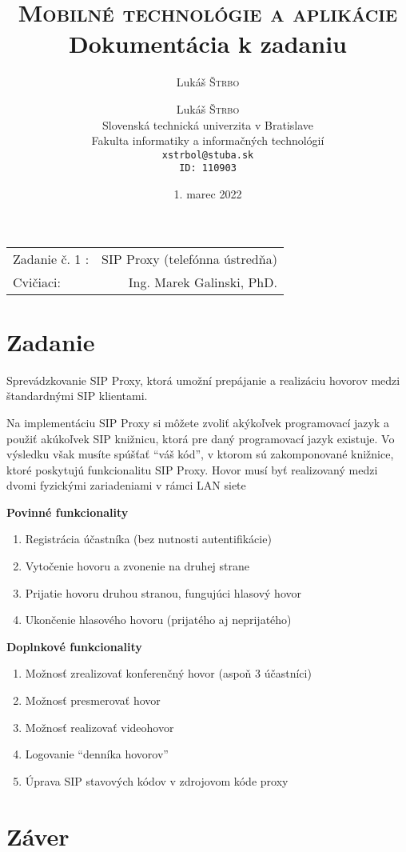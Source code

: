 \documentclass[10pt,oneside,slovak,a4paper]{article}
\title{\textsc{Mobilné technológie a aplikácie}\\ Dokumentácia k zadaniu} %
\author{Lukáš \textsc{Štrbo}} %
\date{1. marec 2022}
\author{Lukáš \textsc{Štrbo}\\[2pt]
	{\small Slovenská technická univerzita v Bratislave}\\
	{\small Fakulta informatiky a informačných technológií}\\
	{\small \texttt{xstrbol@stuba.sk}}\\
{\small \texttt{ID: 110903}}\\
	}
\begin{document}
\maketitle %

\begin{center}
\begin{tabular}{l r}
Zadanie č. 1 : & SIP Proxy (telefónna ústredňa)\\ 
Cvičiaci: & Ing. Marek Galinski, PhD.
\end{tabular}
\end{center}

\section{Zadanie}
Sprevádzkovanie SIP Proxy, ktorá umožní prepájanie a realizáciu hovorov medzi štandardnými SIP klientami.

Na implementáciu SIP Proxy si môžete zvoliť akýkoľvek programovací jazyk a použiť akúkoľvek SIP knižnicu, ktorá pre daný programovací jazyk existuje. Vo výsledku však musíte spúšťať “váš kód”, v ktorom sú zakomponované knižnice, ktoré poskytujú funkcionalitu SIP Proxy. Hovor musí byť realizovaný medzi dvomi fyzickými zariadeniami v rámci LAN siete


\textbf{Povinné funkcionality}
\begin{enumerate}[label=(\alph*)]
	\item Registrácia účastníka (bez nutnosti autentifikácie) 
	\item Vytočenie hovoru a zvonenie na druhej strane 
	\item Prijatie hovoru druhou stranou, fungujúci hlasový hovor 
	\item Ukončenie hlasového hovoru (prijatého aj neprijatého) 
\end{enumerate}


\textbf{Doplnkové funkcionality}
\begin{enumerate}[label=(\alph*)]
	\item Možnosť zrealizovať konferenčný hovor (aspoň 3 účastníci) 
	\item Možnosť presmerovať hovor 
	\item Možnosť realizovať videohovor 
	\item Logovanie “denníka hovorov”
	\item Úprava SIP stavových kódov v zdrojovom kóde proxy
\end{enumerate}

\section{Záver}




\end{document}
